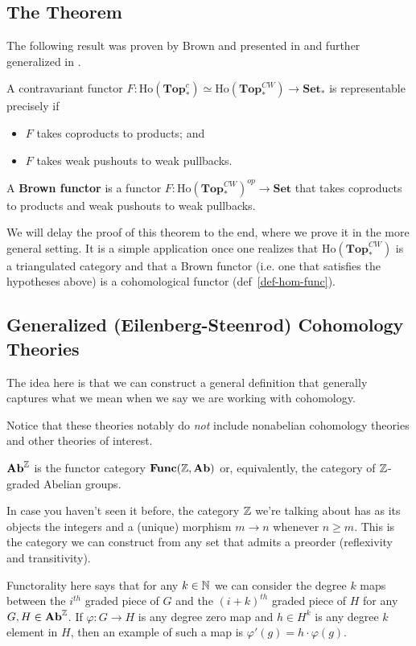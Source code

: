 \documentclass[12pt]{article}
\newcommand*{\pTopc}{\mathbf{Top}_\ast^c}
\newcommand*{\Set}{\mathbf{Set}}
\newcommand*{\Func}{\mathbf{Func}}
\newcommand*{\pCW}{\mathbf{Top}^{CW}_\ast}
\begin{document}
\subsection{The Theorem}
The following result was proven by Brown and presented in \cite{brown65} and further generalized in \cite{adams71}.
\begin{thm}[Brown `65]\label{thm-brown}
	A contravariant functor $F:\text{Ho}(\pTopc)\simeq\text{Ho}(\pCW)\to\mathbf{Set}_\ast$ is representable precisely if 
	\begin{itemize}
		\item $F$ takes coproducts to products; and 
		\item $F$ takes weak pushouts to weak pullbacks.
	\end{itemize}
\end{thm}
\begin{defn}
	A \textbf{Brown functor} is a functor $F:\text{Ho}(\pCW)^{op}\to\Set$ that takes coproducts to products and weak pushouts to weak pullbacks.
\end{defn}
\begin{rmk}
	We will delay the proof of this theorem to the end, where we prove it in the more general setting. It is a simple application 
	once one realizes that $\text{Ho}(\pCW)$ is a triangulated category and that a Brown functor (i.e. one that 
	satisfies the hypotheses above) is a cohomological functor (def~\ref{def-hom-func}).
\end{rmk}

\subsection{Generalized (Eilenberg-Steenrod) Cohomology Theories}
The idea here is that we can construct a general definition that generally captures what we mean when we say we are 
working with cohomology.

Notice that these theories notably do \textit{not} include nonabelian cohomology theories and other theories of interest.
\begin{defn}
	$\mathbf{Ab}^{\mathbb{Z}}$ is the functor category $\Func(\bbZ,\Ab)$ or, equivalently, the category of $\mathbb{Z}$-graded Abelian groups.
\end{defn}
\begin{rmk}
	In case you haven't seen it before, the category $\mathbb{Z}$ we're talking about has as its objects the integers and 
	a (unique) morphism $m\to n$ whenever $n\ge m$. This is the category we can construct from any set that admits a preorder (reflexivity and transitivity).

	Functorality here says that for any $k\in\mathbb{N}$ we can consider the degree $k$ maps between the $i^{th}$ graded piece 
	of $G$ and the $(i+k)^{th}$ graded piece of $H$ for any $G,H\in\mathbf{Ab}^{\mathbb{Z}}$. If $\varphi:G\to H$ is any degree zero map and $h\in H^k$ is 
	any degree $k$ element in $H$, then an example of such a map is $\varphi'(g)=h\cdot \varphi(g).$
\end{rmk}
\end{document}
